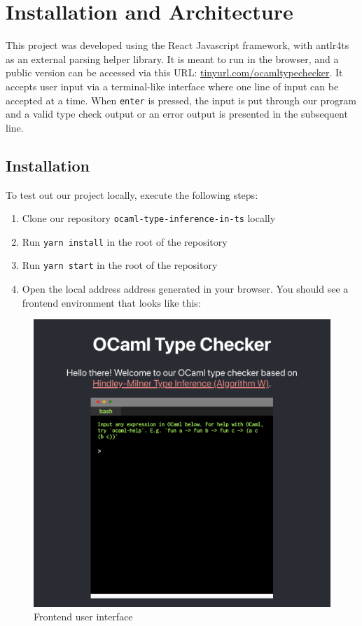 \section{Installation and Architecture}
This project was developed using the React Javascript framework, with antlr4ts as an external parsing helper library. It is meant to run in the browser, and a public version can be accessed via this URL: \url{tinyurl.com/ocamltypechecker}. It accepts user input via a terminal-like interface where one line of input can be accepted at a time. When \verb|enter| is pressed, the input is put through our program and a valid type check output or an error output is presented in the subsequent line.

\subsection{Installation}
To test out our project locally, execute the following steps:
\begin{enumerate}
    \item Clone our repository \verb|ocaml-type-inference-in-ts| locally
    \item Run \verb|yarn install| in the root of the repository
    \item Run \verb|yarn start| in the root of the repository
    \item Open the local address address generated in your browser. You should see a frontend environment that looks like this: 
\end{enumerate}
\begin{figure}[H]
\centerline{\includegraphics[width=0.8\linewidth]{images/frontend-ui.png}}
\caption{Frontend user interface}
\label{fig}
\end{figure}

